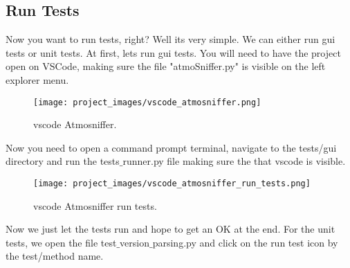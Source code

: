 \subsection{Run Tests}
Now you want to run tests, right? Well its very simple. We can either run gui tests or unit tests. At first, lets run gui tests. You will need to have the project open on VSCode, making sure the file "atmoSniffer.py" is visible on the left explorer menu.

\begin{figure}[H]
\centering
\texttt{[image: project\_images/vscode\_atmosniffer.png]}
 \caption{vscode Atmosniffer.}
 \label{fig:vscode_atmo}
\end{figure}

Now you need to open a command prompt terminal, navigate to the tests/gui directory and run the tests$\_$runner.py file making sure the that vscode is visible.

\begin{figure}[H]
\centering
\texttt{[image: project\_images/vscode\_atmosniffer\_run\_tests.png]}
 \caption{vscode Atmosniffer run tests.}
 \label{fig:vscode_atmo_run_tests}
\end{figure}

Now we just let the tests run and hope to get an OK at the end. For the unit tests, we open the file test$\_$version$\_$parsing.py and click on the run test icon by the test/method name.


